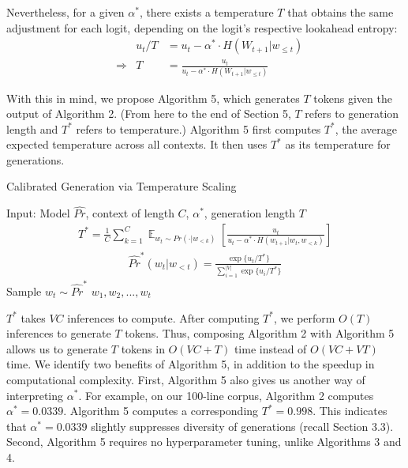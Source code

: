 \documentclass[pageno]{jpaper}
\DeclareMathOperator*{\E}{\mathbb{E}}
\begin{document}
Nevertheless, for a given $\alpha^*$, there exists a temperature $T$ that obtains the same adjustment for each logit, depending on the logit's respective lookahead entropy:
\begin{align*}
    & \quad &
    u_t / T &= u_t - \alpha^* \cdot H(W_{t+1} | w_{\leq t}) \\
    & \Rightarrow &
    T &= \frac{u_t}{u_t - \alpha^* \cdot H(W_{t+1} | w_{\leq t})}
\end{align*}

With this in mind, we propose Algorithm 5, which generates $T$ tokens given the output of Algorithm 2. (From here to the end of Section 5, $T$ refers to generation length and $T^*$ refers to temperature.) Algorithm 5 first computes $T^*$, the average expected temperature across all contexts. It then uses $T^*$ as its temperature for generations.

\begin{algorithm}
    \renewcommand{\thealgorithm}{5}
    \caption{Calibrated Generation via Temperature Scaling}
    \begin{algorithmic}[1]
    \State Input: Model $\widehat{Pr}$, context of length $C$, $\alpha^*$, generation length $T$
    \State \begin{align*}
        T^* = \frac{1}{C} \sum_{k=1}^C \E_{w_t \sim Pr(\cdot|w_{<k})}\left[\frac{u_t}{u_t - \alpha^* \cdot H(w_{t+1}| w_t, w_{<k})}\right]
    \end{align*}
    \State \begin{align*}
        \widehat{Pr}^*(w_t | w_{<t}) = \frac{\exp \{ u_t / T^*\}}{\sum_{i = 1}^{|V|} \exp\{u_i / T^*\}}
    \end{align*}
    \State Sample $w_t \sim \widehat{Pr}^*$
    \EndFor
    \State \Return $w_1, w_2, ..., w_t$
    \end{algorithmic}
\end{algorithm}

$T^*$ takes $VC$ inferences to compute. After computing $T^*$, we perform $O(T)$ inferences to generate $T$ tokens. Thus, composing Algorithm 2 with Algorithm 5 allows us to generate $T$ tokens in $O(VC + T)$ time instead of $O(VC + VT)$ time. We identify two benefits of Algorithm 5, in addition to the speedup in computational complexity. First, Algorithm 5 also gives us another way of interpreting $\alpha^*$. For example, on our 100-line corpus, Algorithm 2 computes $\alpha^* = 0.0339$. Algorithm 5 computes a corresponding $T^* = 0.998$. This indicates that $\alpha^* = 0.0339$ slightly suppresses diversity of generations (recall Section 3.3). Second, Algorithm 5 requires no hyperparameter tuning, unlike Algorithms 3 and 4.
\end{document}
